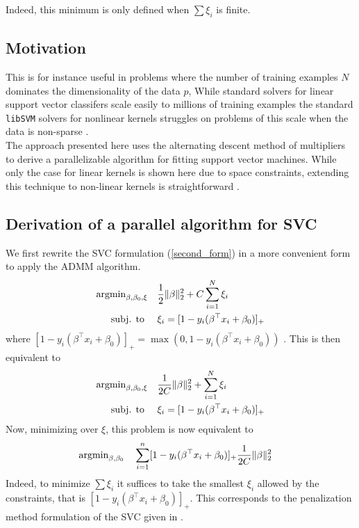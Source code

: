 \documentclass[11pt]{article}
\begin{document}
Indeed, this minimum is only defined when $\sum \xi_i$ is finite. 


\subsection{Motivation}

This is for instance useful in problems where the number of training examples
$N$ dominates the dimensionality of the data $p$, 
While standard solvers for linear support vector classifers scale easily to millions of training examples \cite{fan2008liblinear}
the standard \texttt{libSVM} solvers for nonlinear kernels struggles on problems of this 
scale when the data is non-sparse \cite{chang2011libsvm}. \\

The approach presented here uses the alternating descent method of multipliers to derive 
a parallelizable algorithm for fitting support vector machines. While only the case for linear 
kernels is shown here due to space constraints, extending this technique to non-linear kernels 
is straightforward \cite{forero2010consensus}.


\subsection{Derivation of a parallel algorithm for SVC}

We first rewrite the SVC formulation (\ref{second_form}) in a more convenient form to apply the ADMM algorithm.
\begin{equation*} 
\begin{aligned}
    \operatorname{argmin}_{\beta, \beta_0, \xi} \quad &   \frac{1}{2} \|\beta\|_2^2 + C\sum_{i=1}^N \xi_i\\
    \textrm{subj. to } \quad & \xi_i =  [1 - y_i (\beta^\top x_i + \beta_0)]_+
\end{aligned}
\end{equation*}
where  $[1 - y_i (\beta^\top x_i + \beta_0)]_+ = \max(0, 1 - y_i (\beta^\top x_i + \beta_0))$ . This is then equivalent to
\begin{equation*} 
\begin{aligned}
        \operatorname{argmin}_{\beta, \beta_0, \xi} \quad & \frac{1}{2C} \|\beta\|_2^2 + \sum_{i=1}^N \xi_i\\
        \textrm{subj. to } \quad & \xi_i =  [1 - y_i (\beta^\top x_i + \beta_0)]_+
\end{aligned}
\end{equation*}
Now, minimizing over $\xi$, this problem is now equivalent to
\begin{equation} \label{third_formulation}
\begin{aligned}
        \operatorname{argmin}_{\beta, \beta_0} \quad 
        &  \sum_{i=1}^n [1 - y_i (\beta^\top x_i + \beta_0)]_+ \frac{1}{2C} \|\beta\|_2^2 
\end{aligned}
\end{equation}
Indeed, to minimize $\sum \xi_i$ it suffices to take the smallest $\xi_i$ allowed by the constraints,
that is $[1 - y_i (\beta^\top x_i + \beta_0)]_+$. This corresponds to the penalization method
formulation of the SVC given in \cite{hastie2009elements}. \\
\end{document}
